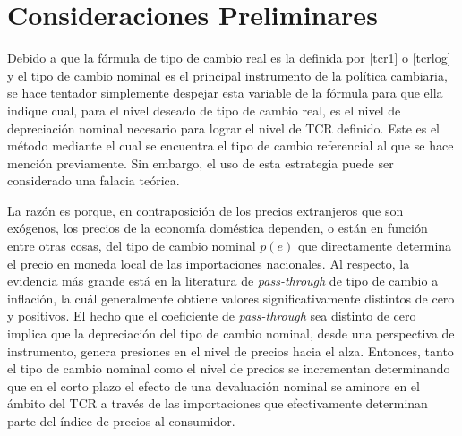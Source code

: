 \documentclass[12pt,letterpaper]{article}
\begin{document}

\section{Consideraciones Preliminares}\label{consid}

Debido a que la fórmula de tipo de cambio real es la definida por \ref{tcr1} o \ref{tcrlog} y el tipo de cambio nominal es el principal instrumento de la política cambiaria, se hace tentador simplemente despejar esta variable de la fórmula para que ella indique cual, para el nivel deseado de tipo de cambio real, es el nivel de depreciación nominal necesario para lograr el nivel de TCR definido. Este es el método mediante el cual se encuentra el tipo de cambio referencial al que se hace mención previamente. Sin embargo, el uso de esta estrategia puede ser considerado una falacia teórica.

La razón es porque, en contraposición de los precios extranjeros que son exógenos, los precios de la economía doméstica dependen, o están en función entre otras cosas, del tipo de cambio nominal $p(e)$ que directamente determina el precio en moneda local de las importaciones nacionales. Al respecto, la evidencia más grande está en la literatura de \emph{pass-through} de tipo de cambio a inflación, la cuál generalmente obtiene valores significativamente distintos de cero y positivos. El hecho que el coeficiente de \emph{pass-through} sea distinto de cero implica que la depreciación del tipo de cambio nominal, desde una perspectiva de instrumento, genera presiones en el nivel de precios hacia el alza. Entonces, tanto el tipo de cambio nominal como el nivel de precios se incrementan determinando que en el corto plazo el efecto de una devaluación nominal se aminore en el ámbito del TCR a través de las importaciones que efectivamente determinan parte del índice de precios al consumidor.
\end{document}
